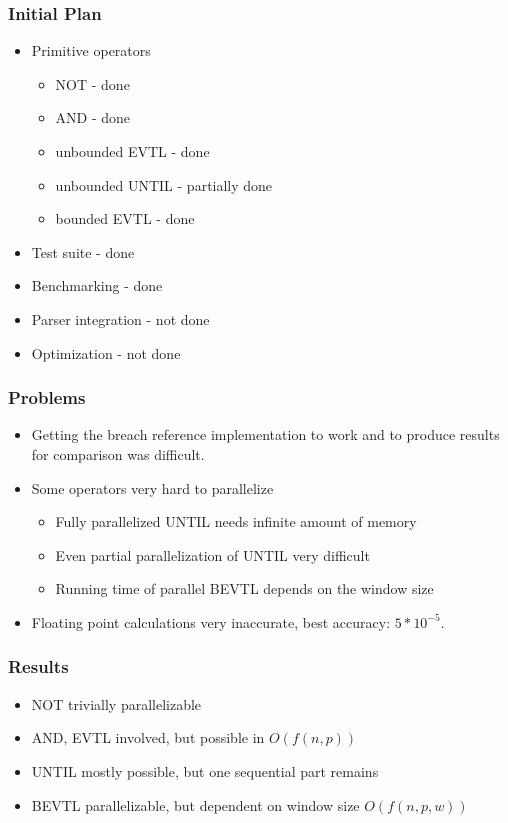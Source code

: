 \documentclass[notes=show]{beamer}
\begin{document}
\begin{frame}
\frametitle{Initial Plan}
\begin{itemize}
\item Primitive operators
\begin{itemize}
\item NOT - done
\item AND - done
\item unbounded EVTL - done
\item unbounded UNTIL - partially done
\item bounded EVTL - done
\end{itemize}
\item Test suite - done
\item Benchmarking - done
\item Parser integration - not done
\item Optimization - not done
\end{itemize}
\end{frame}

\begin{frame}
\frametitle{Problems}
\begin{itemize}
\item Getting the breach reference implementation to work and to produce results for
        comparison was difficult.
\item Some operators very hard to parallelize
\begin{itemize}
\item Fully parallelized UNTIL needs infinite amount of memory
\item Even partial parallelization of UNTIL very difficult
\item Running time of parallel BEVTL depends on the window size
\end{itemize}
\item Floating point calculations very inaccurate, best accuracy: $5*10^{-5}$.
\end{itemize}
\end{frame}

\begin{frame}
\frametitle{Results}
\begin{itemize}
\item NOT trivially parallelizable
\item AND, EVTL involved, but possible in $O(f(n,p))$
\item UNTIL mostly possible, but one sequential part remains
\item BEVTL parallelizable, but dependent on window size $O(f(n,p,w))$
\end{itemize}
\end{frame}
\end{document}
